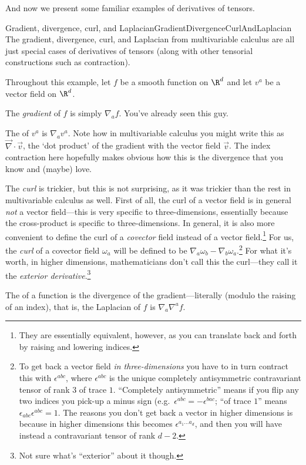 And now we present some familiar examples of derivatives of tensors.
\begin{exm}{Gradient, divergence, curl, and Laplacian}{GradientDivergenceCurlAndLaplacian}
The gradient, divergence, curl, and Laplacian from multivariable calculus are all just special cases of derivatives of tensors (along with other tensorial constructions such as contraction).

Throughout this example, let $f$ be a smooth function on $\R ^d$ and let $v^a$ be a vector field on $\R ^d$. 

The \emph{gradient} of $f$ is simply $\nabla _af$.  You've already seen this guy.

The  of $v^a$ is $\nabla _av^a$.  Note how in multivariable calculus you might write this as $\vec{\nabla}\cdot \vec{v}$, the `dot product' of the gradient with the vector field $\vec{v}$.  The index contraction here hopefully makes obvious how this is the divergence that you know and (maybe) love.

The \emph{curl} is trickier, but this is not surprising, as it was trickier than the rest in multivariable calculus as well.  First of all, the curl of a vector field is in general \emph{not} a vector field---this is very specific to three-dimensions, essentially because the cross-product is specific to three-dimensions.  In general, it is also more convenient to define the curl of a \emph{covector} field instead of a vector field.\footnote{They are essentially equivalent, however, as you can translate back and forth by raising and lowering indices.}  For us, the \emph{curl} of a covector field $\omega _a$ will be defined to be $\nabla _a\omega _b-\nabla _b\omega _a$.\footnote{To get back a vector field \emph{in three-dimensions} you have to in turn contract this with $\epsilon ^{abc}$, where $\epsilon ^{abc}$ is the unique completely antisymmetric contravariant tensor of rank $3$ of trace $1$.  ``Completely antisymmetric'' means if you flip any two indices you pick-up a minus sign (e.g.~$\epsilon ^{abc}=-\epsilon ^{bac}$; ``of trace $1$'' means $\epsilon _{abc}\epsilon ^{abc}=1$.  The reasons you don't get back a vector in higher dimensions is because in higher dimensions this becomes $\epsilon ^{a_1\ldots a_d}$, and then you will have instead a contravariant tensor of rank $d-2$.}  For what it's worth, in higher dimensions, mathematicians don't call this the curl---they call it the \emph{exterior derivative}.\footnote{Not sure what's ``exterior'' about it though.}

The  of a function is the divergence of the gradient---literally (modulo the raising of an index), that is, the Laplacian of $f$ is $\nabla _a\nabla ^af$.
\end{exm}

